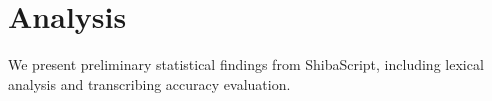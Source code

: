 \section{Analysis}

We present preliminary statistical findings from ShibaScript, including lexical analysis and transcribing accuracy evaluation.







